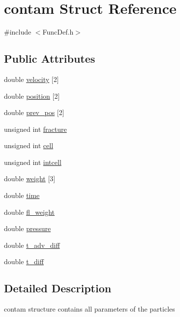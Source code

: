 \hypertarget{structcontam}{}\section{contam Struct Reference}
\label{structcontam}


{\ttfamily \#include $<$Func\+Def.\+h$>$}

\subsection*{Public Attributes}
\begin{DoxyCompactItemize}
\item 
double \mbox{\hyperlink{structcontam_a70e44829116675e21bda7422f0c2b777}{velocity}} \mbox{[}2\mbox{]}
\item 
double \mbox{\hyperlink{structcontam_afdb17185baff7dc4f22cd6c76c6fd6fd}{position}} \mbox{[}2\mbox{]}
\item 
double \mbox{\hyperlink{structcontam_aacd8d2e19b4a3c689e96cf9693218777}{prev\+\_\+pos}} \mbox{[}2\mbox{]}
\item 
unsigned int \mbox{\hyperlink{structcontam_a0b9253ce268d781958145f9d110df2de}{fracture}}
\item 
unsigned int \mbox{\hyperlink{structcontam_a858c05f3221a70f6e212c1e7e172252c}{cell}}
\item 
unsigned int \mbox{\hyperlink{structcontam_a1747a7b7a63f22656afa1df6462279e8}{intcell}}
\item 
double \mbox{\hyperlink{structcontam_a5b317ab55ab5b48dc82c9a473c76a41e}{weight}} \mbox{[}3\mbox{]}
\item 
double \mbox{\hyperlink{structcontam_a11c5e87e6e62d258648d5a02472251d5}{time}}
\item 
double \mbox{\hyperlink{structcontam_ad50f20b01e37af1fedfd7bbe0cd1d7e3}{fl\+\_\+weight}}
\item 
double \mbox{\hyperlink{structcontam_a185c332f0d90695ee85c1e243085e2ba}{pressure}}
\item 
double \mbox{\hyperlink{structcontam_aaa72e564c7052e029003076e0d8768be}{t\+\_\+adv\+\_\+diff}}
\item 
double \mbox{\hyperlink{structcontam_aaff43bc31b910d7ac48f5d0a78f2212b}{t\+\_\+diff}}
\end{DoxyCompactItemize}


\subsection{Detailed Description}
contam structure contains all parameters of the particles 

